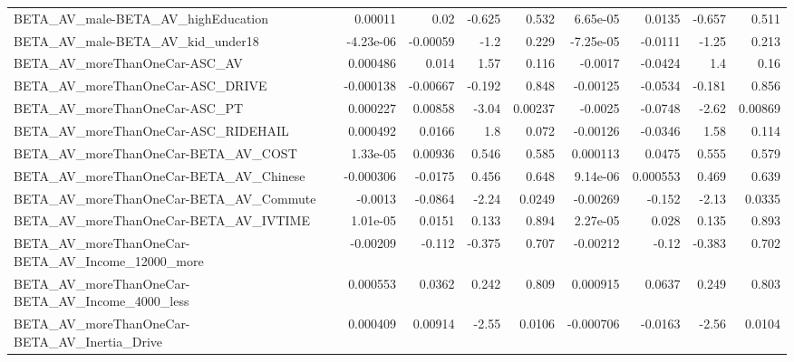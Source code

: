 \begin{tabular}{lrrrrrrrr}
BETA\_AV\_male-BETA\_AV\_highEducation                 &     0.00011 &         0.02 &   -0.625 &    0.532 &   6.65e-05 &      0.0135 &       -0.657 &         0.511 \\
BETA\_AV\_male-BETA\_AV\_kid\_under18                   &   -4.23e-06 &     -0.00059 &     -1.2 &    0.229 &  -7.25e-05 &     -0.0111 &        -1.25 &         0.213 \\
BETA\_AV\_moreThanOneCar-ASC\_AV                      &    0.000486 &        0.014 &     1.57 &    0.116 &    -0.0017 &     -0.0424 &          1.4 &          0.16 \\
BETA\_AV\_moreThanOneCar-ASC\_DRIVE                   &   -0.000138 &     -0.00667 &   -0.192 &    0.848 &   -0.00125 &     -0.0534 &       -0.181 &         0.856 \\
BETA\_AV\_moreThanOneCar-ASC\_PT                      &    0.000227 &      0.00858 &    -3.04 &  0.00237 &    -0.0025 &     -0.0748 &        -2.62 &       0.00869 \\
BETA\_AV\_moreThanOneCar-ASC\_RIDEHAIL                &    0.000492 &       0.0166 &      1.8 &    0.072 &   -0.00126 &     -0.0346 &         1.58 &         0.114 \\
BETA\_AV\_moreThanOneCar-BETA\_AV\_COST                &    1.33e-05 &      0.00936 &    0.546 &    0.585 &   0.000113 &      0.0475 &        0.555 &         0.579 \\
BETA\_AV\_moreThanOneCar-BETA\_AV\_Chinese             &   -0.000306 &      -0.0175 &    0.456 &    0.648 &   9.14e-06 &    0.000553 &        0.469 &         0.639 \\
BETA\_AV\_moreThanOneCar-BETA\_AV\_Commute             &     -0.0013 &      -0.0864 &    -2.24 &   0.0249 &   -0.00269 &      -0.152 &        -2.13 &        0.0335 \\
BETA\_AV\_moreThanOneCar-BETA\_AV\_IVTIME              &    1.01e-05 &       0.0151 &    0.133 &    0.894 &   2.27e-05 &       0.028 &        0.135 &         0.893 \\
BETA\_AV\_moreThanOneCar-BETA\_AV\_Income\_12000\_more   &    -0.00209 &       -0.112 &   -0.375 &    0.707 &   -0.00212 &       -0.12 &       -0.383 &         0.702 \\
BETA\_AV\_moreThanOneCar-BETA\_AV\_Income\_4000\_less    &    0.000553 &       0.0362 &    0.242 &    0.809 &   0.000915 &      0.0637 &        0.249 &         0.803 \\
BETA\_AV\_moreThanOneCar-BETA\_AV\_Inertia\_Drive       &    0.000409 &      0.00914 &    -2.55 &   0.0106 &  -0.000706 &     -0.0163 &        -2.56 &        0.0104 \\

\end{tabular}
